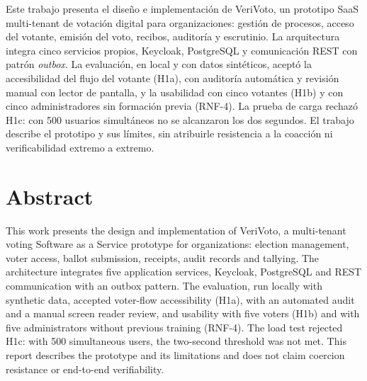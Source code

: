 \vspace{0.7cm}

Este trabajo presenta el diseño e implementación de VeriVoto, un prototipo SaaS
multi-tenant de votación digital para organizaciones: gestión de procesos, acceso
del votante, emisión del voto, recibos, auditoría y escrutinio. La arquitectura
integra cinco servicios propios, Keycloak, PostgreSQL y comunicación REST con
patrón \emph{outbox}. La evaluación, en local y con datos sintéticos, aceptó la
accesibilidad del flujo del votante (H1a), con auditoría automática y revisión
manual con lector de pantalla, y la usabilidad con cinco votantes (H1b) y con
cinco administradores sin formación previa (RNF-4). La prueba de carga rechazó
H1c: con 500 usuarios simultáneos no se alcanzaron los dos segundos. El trabajo
describe el prototipo y sus límites, sin atribuirle resistencia a la coacción ni
verificabilidad extremo a extremo.

\vspace{0.7cm}

\section*{Abstract}
This work presents the design and implementation of VeriVoto, a multi-tenant
voting Software as a Service prototype for organizations: election management,
voter access, ballot submission, receipts, audit records and tallying. The
architecture integrates five application services, Keycloak, PostgreSQL and REST
communication with an outbox pattern. The evaluation, run locally with synthetic
data, accepted voter-flow accessibility (H1a), with an automated audit and a
manual screen reader review, and usability with five voters (H1b) and with five
administrators without previous training (RNF-4). The load test rejected H1c: with
500 simultaneous users, the two-second threshold was not met. This report
describes the prototype and its limitations and does not claim coercion
resistance or end-to-end verifiability.
